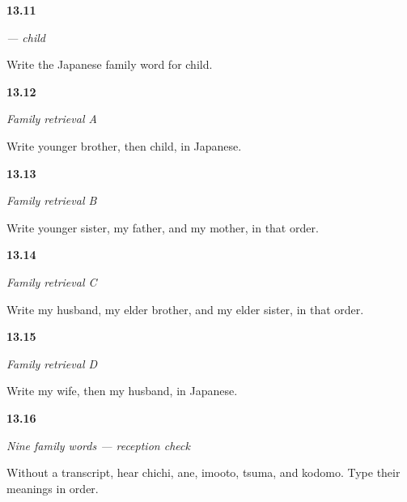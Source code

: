 \noindent\begin{minipage}[t]{\linewidth}
\raggedright
\hypertarget{review-JA-C13-kodomo-recall}{\textbf{13.11}} \emph{ — child}\par
\small Write the Japanese family word for child.
\end{minipage}\par\medskip

\noindent\begin{minipage}[t]{\linewidth}
\raggedright
\hypertarget{review-JA-R13-family-a-recall}{\textbf{13.12}} \emph{Family retrieval A}\par
\small Write younger brother, then child, in Japanese.
\end{minipage}\par\medskip

\noindent\begin{minipage}[t]{\linewidth}
\raggedright
\hypertarget{review-JA-R13-family-b-recall}{\textbf{13.13}} \emph{Family retrieval B}\par
\small Write younger sister, my father, and my mother, in that order.
\end{minipage}\par\medskip

\noindent\begin{minipage}[t]{\linewidth}
\raggedright
\hypertarget{review-JA-R13-family-c-recall}{\textbf{13.14}} \emph{Family retrieval C}\par
\small Write my husband, my elder brother, and my elder sister, in that order.
\end{minipage}\par\medskip

\noindent\begin{minipage}[t]{\linewidth}
\raggedright
\hypertarget{review-JA-R13-family-d-recall}{\textbf{13.15}} \emph{Family retrieval D}\par
\small Write my wife, then my husband, in Japanese.
\end{minipage}\par\medskip

\noindent\begin{minipage}[t]{\linewidth}
\raggedright
\hypertarget{review-JA-C13-family-reception-listening}{\textbf{13.16}} \emph{Nine family words — reception check}\par
\small Without a transcript, hear chichi, ane, imooto, tsuma, and kodomo. Type their meanings in order.
\end{minipage}\par\medskip

